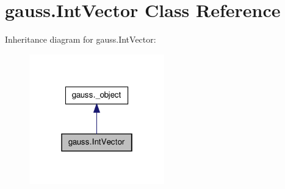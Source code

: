 \hypertarget{classgauss_1_1_int_vector}{\section{gauss.\-Int\-Vector Class Reference}
\label{classgauss_1_1_int_vector}
}


Inheritance diagram for gauss.\-Int\-Vector\-:\nopagebreak
\begin{figure}[H]
\begin{center}
\leavevmode
\includegraphics[width=166pt]{classgauss_1_1_int_vector__inherit__graph}
\end{center}
\end{figure}
